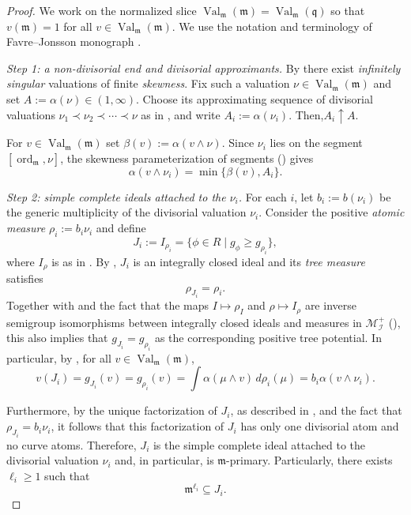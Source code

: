 \documentclass[12pt]{amsart}
\newcommand{\m}{\mathfrak m}
\newcommand{\q}{\mathfrak q}
\newcommand{\ord}{\operatorname{\mathrm{ord}}}
\DeclareMathOperator{\Val}{Val}
\theoremstyle{plain}
\theoremstyle{definition}
\numberwithin{equation}{section}
\begin{document}
\begin{proof}
We work on the normalized slice $\Val_{\m}(\m)=\Val_{\m}(\q)$ so that
$v(\m)=1$ for all $v\in\Val_{\m}(\m)$. We use the notation and terminology
of Favre--Jonsson monograph \cite{FJ04}.

\smallskip
\noindent\textit{Step 1: a non-divisorial end and divisorial approximants.}
By \cite[Prop.~A.3]{FJ04} there exist \emph{infinitely singular} valuations of
finite \emph{skewness}. Fix such a valuation $\nu\in\Val_{\m}(\m)$ and set
$A:=\alpha(\nu)\in(1,\infty)$.  
Choose its approximating sequence of divisorial valuations
$\nu_1\prec\nu_2\prec\cdots\prec\nu$ as in
\cite[Prop.~3.44, Def.~3.45]{FJ04}, and write $A_i:=\alpha(\nu_i)$.
Then,$A_i\uparrow A$.  

For $v\in\Val_{\m}(\m)$ set $\beta(v):=\alpha(v\wedge\nu)$.
Since $\nu_i$ lies on the segment $[\ord_{\m},\nu]$, the skewness
parameterization of segments (\cite[Thm.~3.26]{FJ04}) gives
\[
\alpha(v\wedge\nu_i)=\min\{\beta(v),A_i\}.
\]

\smallskip
\noindent\textit{Step 2: simple complete ideals attached to the $\nu_i$.}
For each $i$, let $b_i:=b(\nu_i)$ be the generic multiplicity of the divisorial
valuation $\nu_i$. Consider the positive \emph{atomic measure} $\rho_i:=b_i\nu_i$ and define
\[
J_i:=I_{\rho_i}=\{\phi\in R\mid g_\phi\ge g_{\rho_i}\},
\]
where $I_\rho$ is as in \cite[(8.3)]{FJ04}. By \cite[Thm.~8.12]{FJ04},
$J_i$ is an integrally closed ideal and its \emph{tree measure} satisfies 
$$\rho_{J_i}=\rho_i.$$
Together with \cite[Prop. 8.9]{FJ04} and the fact that the maps $I \mapsto \rho_I$ and $\rho \mapsto I_\rho$ are inverse semigroup isomorphisms between integrally closed ideals and measures in $\mathcal{M}_{\mathcal{I}}^+$ (\cite[Thm. 8.12]{FJ04}), this also implies that 
$g_{J_i} = g_{\rho_i}$ as the corresponding positive tree potential. In particular, by \cite[Thm. 7.48 and (8.1)]{FJ04}, for all $v \in \Val_{\m}(\m)$,
$$v(J_i) = g_{J_i}(v) = g_{\rho_i}(v) = \int \alpha(\mu\wedge v)\,d\rho_i(\mu) = b_i \alpha(v \wedge \nu_i).$$

Furthermore, by the unique factorization of $J_i$, as described in \cite[Thm. 8.12]{FJ04}, and the fact that $\rho_{J_i} = b_i \nu_i$, it follows that this factorization of $J_i$ has only one divisorial atom and no curve atoms. Therefore, $J_i$ is the simple complete ideal attached to the divisorial valuation $\nu_i$ and, in particular, is $\m$-primary. Particularly, there exists $\ell_i\ge 1$ such that
\[
\m^{\ell_i}\subseteq J_i.
\]


\end{proof}
\end{document}
